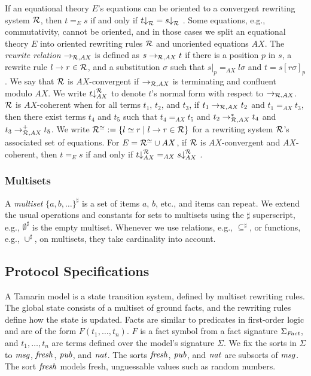 If an equational theory $E$'s equations can be oriented to a convergent rewriting system $\mathcal{R}$, then $t =_E s$ if and only if $t{\downarrow}_{\mathcal{R}} = s{\downarrow}_{\mathcal{R}}$ \cite{RewritingUnification,ACRewriting}.
Some equations, e.g., commutativity, cannot be oriented, and in those cases we split an equational theory $E$ into oriented rewriting rules $\mathcal{R}$ and unoriented equations $AX$.
The \emph{rewrite relation} $\to_{\mathcal{R},AX}$ is defined as $s \to_{\mathcal{R},AX} t$ if there is a position $p$ in $s$, a rewrite rule $l \to r \in \mathcal{R}$, and a substitution $\sigma$ such that $s|_p =_{AX} l\sigma$ and $t = s[r\sigma]_p$.
We say that $\mathcal{R}$ is $AX$-convergent if $\to_{\mathcal{R},AX}$ is terminating and confluent modulo $AX$.
We write $t{\downarrow}_{AX}^{\mathcal{R}}$ to denote $t$'s normal form with respect to $\to_{\mathcal{R},AX}$.
$\mathcal{R}$ is $AX$-coherent when for all terms $t_1$, $t_2$, and $t_3$, if $t_1 \to_{\mathcal{R},AX} t_2$ and $t_1 =_{AX} t_3$, then there exist terms $t_4$ and $t_5$ such that $t_4 =_{AX} t_5$ and $t_2 \to^*_{\mathcal{R},AX} t_4$ and $t_3 \to_{\mathcal{R},AX}^+ t_5$.
We write $\mathcal{R}^\simeq := \{ l \simeq r \mid l \to r \in \mathcal{R} \}$ for a rewriting system $\mathcal{R}$'s associated set of equations.
For $E = \mathcal{R}^\simeq \cup AX$, if $\mathcal{R}$ is $AX$-convergent and $AX$-coherent, then $t =_E s$ if and only if $t{\downarrow}_{AX}^{\mathcal{R}} =_{AX} s{\downarrow}_{AX}^{\mathcal{R}}$ \cite{RewritingUnification,ACRewriting}.

\subsubsection{Multisets}

A \emph{multiset} $\{a, b, \dots\}^\sharp$ is a set of items $a$, $b$, etc., and items can repeat.
We extend the usual operations and constants for sets to multisets using the $\sharp$ superscript, e.g., $\emptyset^\sharp$ is the empty multiset.
Whenever we use relations, e.g., $\subseteq^\sharp$, or functions, e.g., $\cup^\sharp$, on multisets, they take cardinality into account.

\subsection{Protocol Specifications}
\label{subsec:protocol-specs}

A Tamarin model is a state transition system, defined by multiset rewriting rules.
The global state consists of a multiset of ground facts, and the rewriting rules define how the state is updated.
Facts are similar to predicates in first-order logic and are of the form $F(t_1, \dots, t_n)$.
$F$ is a fact symbol from a fact signature $\Sigma_\mathit{Fact}$, and $t_1, \dots, t_n$ are terms defined over the model's signature $\Sigma$.
We fix the sorts in $\Sigma$ to $\mathit{msg}$, $\mathit{fresh}$, $\mathit{pub}$, and $\mathit{nat}$.
The sorts $\mathit{fresh}$, $\mathit{pub}$, and $\mathit{nat}$ are subsorts of $\mathit{msg}$.
The sort $\mathit{fresh}$ models fresh, unguessable values such as random numbers.

